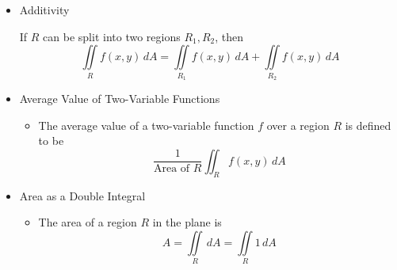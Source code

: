\documentclass[12pt]{article}
\newcommand{\dvar}[1]{\,d{#1}}
\renewcommand{\d}[1]{\dvar{#1}}
\newcommand{\<}{\left<}
\renewcommand{\>}{\right>}
\begin{document}
\begin{itemize}
      
    \item Additivity
    
    If $R$ can be split into two regions $R_1,R_2$, then
      \[\iint\limits_R f(x,y)\,dA = \iint\limits_{R_1} f(x,y)\,dA + \iint\limits_{R_2} f(x,y)\,dA\]

  \item Average Value of Two-Variable Functions
    \begin{itemize}
      \item The average value of a two-variable function $f$ over a region $R$ is defined to be
        \[
          \frac{1}{\text{Area of }R}\iint_R f(x,y)\d{A}
        \]
    \end{itemize}

  \item Area as a Double Integral
    
    \begin{itemize}
    \item The area of a region $R$ in the plane is \[A = \iint\limits_R\,dA=\iint\limits_R 1\,dA\]
    \end{itemize}
    
  
    
  \end{itemize}
  
\end{document}
